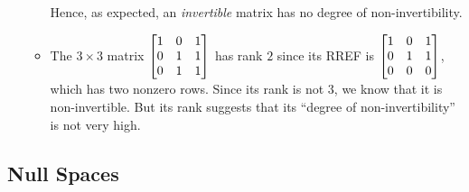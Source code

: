\begin{enumerate}
\begin{itemize}
Hence, as expected, an \emph{invertible} matrix has no degree of
non-invertibility.
\item The \(3\times 3\) matrix \(\mqty[1&0&1\\ 0&1&1\\ 0&1&1]\) has rank \(2\)
since its RREF is \(\mqty[1&0&1\\ 0&1&1\\ 0&0&0]\), which has two nonzero rows.
Since its rank is not \(3\), we know that it is non-invertible. But its rank
suggests that its ``degree of non-invertibility'' is not very high.
\end{itemize}
\end{enumerate}
\subsection{Null Spaces}
